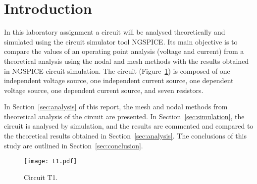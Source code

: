 \section{Introduction}
\label{sec:introduction}

In this laboratory assignment a circuit will be analysed theoretically and simulated using the circuit simulator tool NGSPICE. Its main objective is to compare the values of an operating point analysis (voltage and current) from a theoretical analysis using the nodal and mesh methods with the results obtained in NGSPICE circuit simulation.
The circuit (Figure~\ref{fig:t1}) is composed of one independent voltage source, one independent current source, one dependent voltage source, one dependent current source, and seven resistors.

In Section~\ref{sec:analysis} of this report, the mesh and nodal methods from theoretical analysis of the circuit are
presented. In Section~\ref{sec:simulation}, the circuit is analysed by
simulation, and the results are commented and compared to the theoretical results obtained in
Section~\ref{sec:analysis}. The conclusions of this study are outlined in
Section~\ref{sec:conclusion}.

\begin{figure}[h] \centering
\texttt{[image: t1.pdf]}
\caption{Circuit T1.}
\label{fig:t1}
\end{figure}

